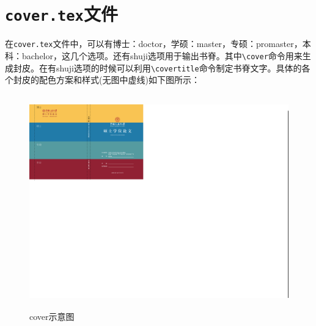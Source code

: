 \section{{\tt cover.tex}文件}
在{\tt cover.tex}文件中，可以有博士：doctor，学硕：master，专硕：promaster，本科：bachelor，这几个选项。还有shuji选项用于输出书脊。其中{\tt \textbackslash cover}命令用来生成封皮。在有shuji选项的时候可以利用{\tt \textbackslash covertitle}命令制定书脊文字。具体的各个封皮的配色方案和样式(无图中虚线)如下图所示：
\begin{figure}[htbp]
\centering\includegraphics[width=14cm,height=9.24cm]{figures/coverpic.pdf}
\caption[cover示意图]{cover示意图}
\end{figure}